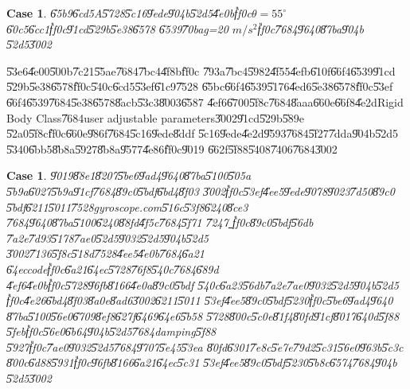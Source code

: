 \documentclass[12pt,a4paper]{article}
\newtheorem{case}[theorem]{Case}
\begin{document}
\begin{case}
\U{65b9}\U{6cd5}A\U{5728}\U{5c16}\U{9ede}\U{904b}\U{52d5}\U{4e0b}\U{ff0c}$%
\theta =55^{\circ }$\U{60c5}\U{6cc1}\U{ff0c}\U{91cd}\U{529b}\U{5e38}\U{6578}%
\U{6539}\U{70ba}g=20 $m/s^{2}$\U{ff0c}\U{7684}\U{9640}\U{87ba}\U{904b}%
\U{52d5}\U{3002}
\end{case}

\U{53e6}\U{4e00}\U{500b}\U{7c21}\U{55ae}\U{7684}\U{7bc4}\U{4f8b}\U{ff0c}%
\U{793a}\U{7bc4}\U{5982}\U{4f55}\U{4efb}\U{610f}\U{66f4}\U{6539}\U{91cd}%
\U{529b}\U{5e38}\U{6578}\U{ff0c}\U{540c}\U{6cd5}\U{53ef}\U{61c9}\U{7528}%
\U{65bc}\U{66f4}\U{6539}\U{5176}\U{4ed6}\U{5e38}\U{6578}\U{ff0c}\U{53ef}%
\U{66f4}\U{6539}\U{7684}\U{5e38}\U{6578}\U{8acb}\U{53c3}\U{8003}\U{6587}%
\U{4ef6}\U{6700}\U{5f8c}\U{7684}\U{8aaa}\U{660e}\U{66f8}\U{4e2d}Rigid Body
Class\U{7684}user adjustable parameters\U{3002}\U{91cd}\U{529b}\U{589e}%
\U{52a0}\U{5f8c}\U{ff0c}\U{660e}\U{986f}\U{7684}\U{5c16}\U{9ede}\U{8ddf}%
\U{5c16}\U{9ede}\U{4e2d}\U{9593}\U{7684}\U{5f27}\U{7dda}\U{904b}\U{52d5}%
\U{5340}\U{6bb5}\U{8b8a}\U{5927}\U{8b8a}\U{9577}\U{4e86}\U{ff0c}\U{9019}%
\U{662f}\U{5f88}\U{5408}\U{7406}\U{7684}\U{3002}

%
\begin{center}

\end{center}%

\begin{case}
\U{9019}\U{88e1}\U{8207}\U{5be6}\U{9ad4}\U{9640}\U{87ba}\U{5100}\U{505a}%
\U{5b9a}\U{6027}\U{5b9a}\U{91cf}\U{7684}\U{89c0}\U{5bdf}\U{6bd4}\U{8f03}%
\U{3002}\U{ff0c}\U{53ef}\U{4ee5}\U{9ede}\U{9078}\U{9023}\U{7d50}\U{89c0}%
\U{5bdf}\U{6211}\U{5011}\U{7528}gyroscope.com\U{516c}\U{53f8}\U{6240}\U{8ce3}%
\U{7684}\U{9640}\U{87ba}\U{5100}\U{6240}\U{88fd}\U{4f5c}\U{7684}\U{5f71}%
\U{7247}\href{http://tinypic.com/r/2clcee/8}{\underline{\color{blue}%
}}\U{ff0c}\U{89c0}\U{5bdf}\U{56db}%
\U{7a2e}\U{7d93}\U{5178}\U{7ae0}\U{52d5}\U{9032}\U{52d5}\U{904b}\U{52d5}%
\U{3002}\U{7136}\U{5f8c}\U{518d}\U{7528}\U{4ee5}\U{4e0b}\U{7684}\U{6a21}%
\U{64ec}code\U{ff0c}\U{6a21}\U{64ec}\U{5728}\U{76f8}\U{540c}\U{7684}\U{689d}%
\U{4ef6}\U{4e0b}\U{ff0c}\U{5728}\U{96fb}\U{8166}\U{4e0a}\U{89c0}\U{5bdf}%
\U{540c}\U{6a23}\U{56db}\U{7a2e}\U{7ae0}\U{9032}\U{52d5}\U{904b}\U{52d5}%
\U{ff0c}\U{4e26}\U{6bd4}\U{8f03}\U{8a0e}\U{8ad6}\U{3002}\U{6211}\U{5011}%
\U{53ef}\U{4ee5}\U{89c0}\U{5bdf}\U{5230}\U{ff0c}\U{5be6}\U{9ad4}\U{9640}%
\U{87ba}\U{5100}\U{56e0}\U{6709}\U{8ef8}\U{627f}\U{6469}\U{64e6}\U{5b58}%
\U{5728}\U{800c}\U{5c0e}\U{81f4}\U{80fd}\U{91cf}\U{8017}\U{640d}\U{5f88}%
\U{5feb}\U{ff0c}\U{56e0}\U{6b64}\U{904b}\U{52d5}\U{7684}damping\U{5f88}%
\U{5927}\U{ff0c}\U{7ae0}\U{9032}\U{52d5}\U{7684}\U{9707}\U{5e45}\U{53ea}%
\U{80fd}\U{6301}\U{7e8c}\U{5e7e}\U{79d2}\U{5c31}\U{56e0}\U{963b}\U{5c3c}%
\U{800c}\U{6d88}\U{5931}\U{ff0c}\U{96fb}\U{8166}\U{6a21}\U{64ec}\U{5c31}%
\U{53ef}\U{4ee5}\U{89c0}\U{5bdf}\U{5230}\U{5b8c}\U{6574}\U{7684}\U{904b}%
\U{52d5}\U{3002}
\end{case}
\end{document}
